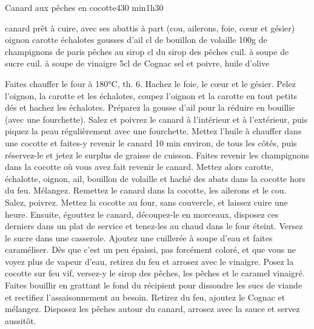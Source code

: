 \begin{recette}{Canard aux pêches en cocotte}{4}{30 min}{1h30}

\begin{ingredients}
 canard prêt à cuire, avec ses abattis à part (cou, ailerons, foie, cœur et gésier)
 oignon
 carotte
 échalotes
 gousses d'ail
 cl de bouillon de volaille
\ingredient 100g de champignons de paris
 pêches au sirop
 cl du sirop des pêches
 cuil. à soupe de sucre
 cuil. à soupe de vinaigre
\ingredient 5cl de Cognac
\ingredient sel et poivre, huile d'olive
\end{ingredients}

\begin{preparation}
\etape Faites chauffer le four à 180°C, th. 6.
\etape Hachez le foie, le cœur et le gésier.
\etape Pelez l'oignon, la carotte et les échalotes, coupez l'oignon et la carotte en tout petits dés et hachez les échalotes. Préparez la gousse d'ail pour la réduire en bouillie (avec une fourchette).
\etape Salez et poivrez le canard à l'intérieur et à l'extérieur, puis piquez la peau régulièrement avec une fourchette.
\etape Mettez l'huile à chauffer dans une cocotte et faites-y revenir le canard 10 min environ, de tous les côtés, puis réservez-le et jetez le surplus de graisse de cuisson.
\etape Faites revenir les champignons dans la cocotte où vous avez fait revenir le canard.
\etape Mettez alors carotte, échalotte, oignon, ail, bouillon de volaille et haché des abats dans la cocotte hors du feu. Mélangez.
\etape Remettez le canard dans la cocotte, les ailerons et le cou. Salez, poivrez.
\etape Mettez la cocotte au four, sans couvercle, et laissez cuire une heure. Ensuite, égouttez le canard, découpez-le en morceaux, disposez ces derniers dans un plat de service et tenez-les au chaud dans le four éteint.
\etape Versez le sucre dans une casserole. Ajoutez une cuillerée à soupe d'eau et faites caraméliser. Dès que c'est un peu épaissi, pas forcément coloré, et que vous ne voyez plus de vapeur d'eau, retirez du feu et arrosez avec le vinaigre.
\etape Posez la cocotte sur feu vif, versez-y le sirop des pêches, les pêches et le caramel vinaigré. Faites bouillir en grattant le fond du récipient pour dissoudre les sucs de viande et rectifiez l'assaisonnement au besoin.
\etape Retirez du feu, ajoutez le Cognac et mélangez.
\etape Disposez les pêches autour du canard, arrosez avec la sauce et servez aussitôt.
\end{preparation}
\end{recette}

